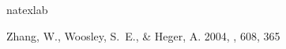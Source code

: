 \documentclass[12pt,preprint]{aastex}
\begin{document}
\begin{thebibliography}{134}
\expandafter\ifx\csname natexlab\endcsname\relax\def\natexlab#1{#1}\fi

Zhang, W., Woosley, S.~E., \& Heger, A. 2004, \apj, 608, 365

\end{thebibliography}


\end{document}
